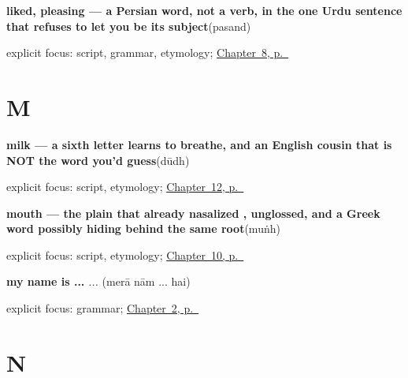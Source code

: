 \noindent\begin{minipage}[t]{\linewidth}
\raggedright
\textbf{liked, pleasing — a Persian word, not a verb, in the one Urdu sentence that refuses to let you be its subject}\enspace\emph{}\enspace(pasand)\par
\footnotesize explicit focus: script, grammar, etymology; \hyperref[ch:ur-social-verbs]{Chapter~8, p.~\pageref*{ch:ur-social-verbs}}
\end{minipage}\par\smallskip

\section*{M}

\noindent\begin{minipage}[t]{\linewidth}
\raggedright
\textbf{milk — a sixth letter learns to breathe, and an English cousin that is NOT the word you'd guess}\enspace\emph{}\enspace(dūdh)\par
\footnotesize explicit focus: script, etymology; \hyperref[ch:ur-food-words]{Chapter~12, p.~\pageref*{ch:ur-food-words}}
\end{minipage}\par\smallskip

\noindent\begin{minipage}[t]{\linewidth}
\raggedright
\textbf{mouth — the plain  that already nasalized , unglossed, and a Greek word possibly hiding behind the same root}\enspace\emph{}\enspace(muṅh)\par
\footnotesize explicit focus: script, etymology; \hyperref[ch:ur-face-words]{Chapter~10, p.~\pageref*{ch:ur-face-words}}
\end{minipage}\par\smallskip

\noindent\begin{minipage}[t]{\linewidth}
\raggedright
\textbf{my name is ...}\enspace\emph{  ... }\enspace(merā nām ... hai)\par
\footnotesize explicit focus: grammar; \hyperref[ch:urdu-name]{Chapter~2, p.~\pageref*{ch:urdu-name}}
\end{minipage}\par\smallskip

\section*{N}

